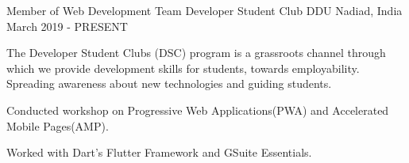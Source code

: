 
\begin{cventries}
  \cventry
    {Member of Web Development Team} %
    {Developer Student Club DDU} %
    {Nadiad, India} %
    {March 2019 - PRESENT} %
    {
      \begin{cvitems} %
        \item {The Developer Student Clubs (DSC) program is a grassroots channel through which we provide development skills for students, towards employability. Spreading awareness about new technologies and guiding students.}
        \item{Conducted workshop on Progressive Web Applications(PWA) and Accelerated Mobile Pages(AMP).}
        \item{Worked with Dart's Flutter Framework and GSuite Essentials.}
      \end{cvitems}
    }

    
\end{cventries}
